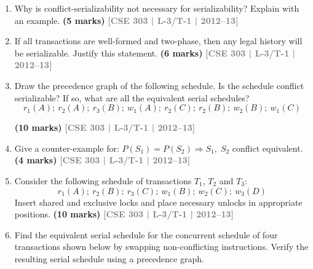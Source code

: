 \documentclass[12pt,a3paper]{article}
\newcommand{\yr}[1]{\hfill\textcolor{gray}{\small\textbf{[#1]}}}
\newcommand{\mk}[1]{\textcolor{orange!70!black}{\small\textbf{(#1 marks)}}}
\begin{document}
\begin{enumerate}
\mk{12} \yr{CSE 303 | L-3/T-1 | 2011--12}

\item Why is conflict-serializability not necessary for serializability? Explain with an example.
\mk{5} \yr{CSE 303 | L-3/T-1 | 2012--13}

\item If all transactions are well-formed and two-phase, then any legal history will be serializable. Justify this statement.
\mk{6} \yr{CSE 303 | L-3/T-1 | 2012--13}

\item Draw the precedence graph of the following schedule. Is the schedule conflict serializable? If so, what are all the equivalent serial schedules?
\[r_1(A);\ r_2(A);\ r_3(B);\ w_1(A);\ r_2(C);\ r_2(B);\ w_2(B);\ w_1(C)\]

\mk{10} \yr{CSE 303 | L-3/T-1 | 2012--13}

\item Give a counter-example for: $P(S_1) = P(S_2) \Rightarrow S_1,\;S_2$ conflict equivalent.
\mk{4} \yr{CSE 303 | L-3/T-1 | 2012--13}

\item Consider the following schedule of transactions $T_1$, $T_2$ and $T_3$:
\[r_1(A);\ r_2(B);\ r_3(C);\ w_1(B);\ w_2(C);\ w_3(D)\]
Insert shared and exclusive locks and place necessary unlocks in appropriate positions.
\mk{10} \yr{CSE 303 | L-3/T-1 | 2012--13}

\item Find the equivalent serial schedule for the concurrent schedule of four transactions shown below by swapping non-conflicting instructions. Verify the resulting serial schedule using a precedence graph.


\end{enumerate}
\end{document}
